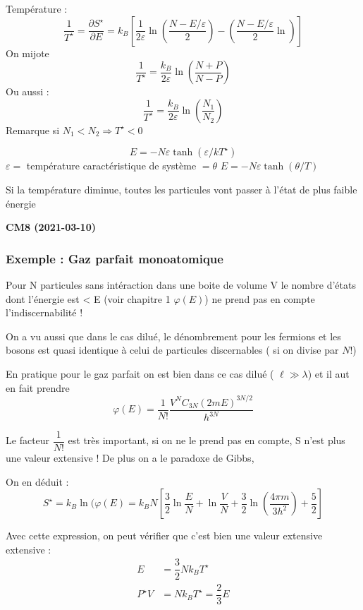 \documentclass[12pt,a4paper]{report}
\begin{document}
Température :
\[
	\dfrac{1}{T^\star} = \dfrac{\partial S^\star}{\partial E} = k_B \left[ \dfrac{1}{2 \varepsilon} \ln \left( \dfrac{N -E/\varepsilon}{2} \right) - \left( \dfrac{N - E/\varepsilon}{2} \ln \right) \right]
\]
On mijote
\[
	\dfrac{1}{T^\star} = \dfrac{k_B}{2 \varepsilon} \ln \left( \dfrac{N + P}{N-P} \right)
\]
Ou aussi :
\[
	\dfrac{1}{T^\star} = \dfrac{k_B}{2 \varepsilon} \ln \left( \dfrac{N_1}{N_2} \right)
\]
Remarque si $N_1 < N_2 \Rightarrow T^\star < 0$

\[
	E = -N\varepsilon \tanh (\varepsilon/kT^\star)
\]
$\varepsilon = $ température caractéristique de système $= \theta$
$E = -N \varepsilon \tanh(\theta/T)$

Si la température diminue, toutes les particules vont passer à l'état de plus faible énergie

\begin{center}
\textbf{CM8 (2021-03-10)}
\end{center}

\subsubsection{Exemple : Gaz parfait monoatomique}

Pour N particules sans intéraction dans une boite de volume V le nombre d'états dont l'énergie est < E (voir chapitre 1 $ \varphi (E) $) ne prend pas en compte l'indiscernabilité !

On a vu aussi que dans le cas dilué, le dénombrement pour les fermions et les bosons est quasi identique à celui de particules discernables ( si on divise par $ N!$)

En pratique pour le gaz parfait on est bien dans ce cas dilué ( $ \ell \gg \lambda $) et il aut en fait prendre 
\[
	\varphi (E) = \dfrac{1}{N!}\dfrac{V^N C_{3N} (2 m E)^{3N/2}  }{h^{3N}}
\]

Le facteur $\dfrac{1}{N!}$ est très important, si on ne le prend pas en compte, S n'est plus une valeur extensive ! De plus on a le paradoxe de Gibbs,

On en déduit :
\[
	S^\star = k_B \ln(\varphi(E) = k_B N \left[ \dfrac{3}{2} \ln\dfrac{E}{N} + \ln \dfrac{V}{N} + \dfrac{3}{2} \ln \left( \dfrac{4\pi m}{3h^2} \right) + \dfrac{5}{2} \right]
\]

Avec cette expression, on peut vérifier que c'est bien une valeur extensive extensive :
\begin{align*}
	E &= \dfrac{3}{2} N k_B T^\star\\
	P^\star V &= N k_B T^\star = \dfrac{2}{3} E
\end{align*}
\end{document}
